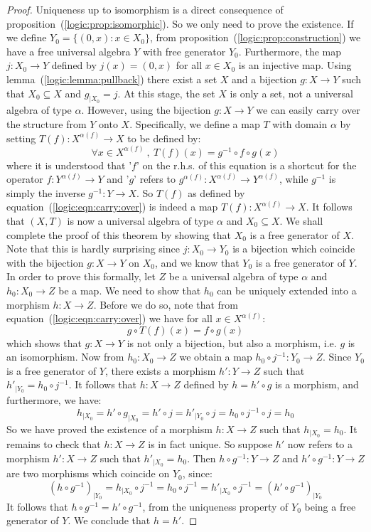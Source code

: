 \begin{proof}
Uniqueness up to isomorphism is a direct consequence of
proposition~(\ref{logic:prop:isomorphic}). So we only need to prove
the existence. If we define $Y_{0}=\{(0,x):x\in X_{0}\}$, from
proposition~(\ref{logic:prop:construction}) we have a free universal
algebra $Y$ with free generator $Y_{0}$. Furthermore, the map
$j:X_{0}\to Y$ defined by $j(x)=(0,x)$ for all $x\in X_{0}$ is an
injective map. Using lemma~(\ref{logic:lemma:pullback}) there exist
a set $X$ and a bijection $g:X\to Y$ such that $X_{0}\subseteq X$
and $g_{|X_{0}}=j$. At this stage, the set $X$ is only a set, not a
universal algebra of type $\alpha$. However, using the bijection
$g:X\to Y$ we can easily carry over the structure from $Y$ onto $X$.
Specifically, we define a map $T$ with domain $\alpha$ by setting
$T(f):X^{\alpha(f)}\to X$ to be defined by:
    \begin{equation}\label{logic:eqn:carry:over}
    \forall x\in X^{\alpha(f)}\ ,\ T(f)(x) = g^{-1}\circ f\circ g(x)
    \end{equation}
where it is understood that '$f$' on the r.h.s. of this equation is
a shortcut for the operator $f:Y^{\alpha(f)}\to Y$ and '$g$' refers
to $g^{\alpha(f)}:X^{\alpha(f)}\to Y^{\alpha(f)}$, while $g^{-1}$ is
simply the inverse $g^{-1}:Y\to X$. So $T(f)$ as defined by
equation~(\ref{logic:eqn:carry:over}) is indeed a map
$T(f):X^{\alpha(f)}\to X$. It follows that $(X,T)$ is now a
universal algebra of type $\alpha$ and $X_{0}\subseteq X$. We shall
complete the proof of this theorem by showing that $X_{0}$ is a free
generator of $X$. Note that this is hardly surprising since
$j:X_{0}\to Y_{0}$ is a bijection which coincide with the bijection
$g:X\to Y$ on $X_{0}$, and we know that $Y_{0}$ is a free generator
of $Y$. In order to prove this formally, let $Z$ be a universal
algebra of type $\alpha$ and $h_{0}:X_{0}\to Z$ be a map. We need to
show that $h_{0}$ can be uniquely extended into a morphism $h:X\to
Z$. Before we do so, note that from
equation~(\ref{logic:eqn:carry:over}) we have for all $x\in
X^{\alpha(f)}$:
    \[
    g\circ T(f)(x) = f\circ g(x)
    \]
which shows that $g:X\to Y$ is not only a bijection, but also a
morphism, i.e. $g$ is an isomorphism. Now from $h_{0}:X_{0}\to Z$ we
obtain a map $h_{0}\circ j^{-1}:Y_{0}\to Z$. Since $Y_{0}$ is a free
generator of $Y$, there exists a morphism $h':Y\to Z$ such that
$h'_{|Y_{0}}=h_{0}\circ j^{-1}$. It follows that $h:X\to Z$ defined
by $h=h'\circ g$ is a morphism, and furthermore, we have:
    \[
    h_{|X_{0}}=h'\circ g_{|X_{0}}=h'\circ j=h'_{|Y_{0}}\circ
    j=h_{0}\circ j^{-1}\circ j=h_{0}
    \]
So we have proved the existence of a morphism $h:X\to Z$ such that
$h_{|X_{0}}=h_{0}$. It remains to check that $h:X\to Z$ is in fact
unique. So suppose $h'$ now refers to a morphism $h':X\to Z$ such
that $h'_{|X_{0}}=h_{0}$. Then $h\circ g^{-1}:Y\to Z$ and $h'\circ
g^{-1}:Y\to Z$ are two morphisms which coincide on $Y_{0}$, since:
    \[
    (h\circ g^{-1})_{|Y_{0}} = h_{|X_{0}}\circ j^{-1} = h_{0}\circ
    j^{-1}=h'_{|X_{0}}\circ j^{-1}=(h'\circ g^{-1})_{|Y_{0}}
    \]
It follows that $h\circ g^{-1} = h'\circ g^{-1}$, from the
uniqueness property of $Y_{0}$ being a free generator of $Y$. We
conclude that $h=h'$.
\end{proof}
